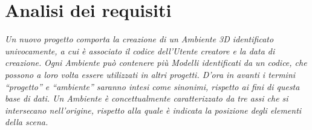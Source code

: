 \documentclass[a4paper,12pt]{report}
\begin{document}
\section{Analisi dei requisiti}
{\it Un nuovo progetto comporta la creazione di un Ambiente 3D identificato univocamente, a cui è associato il codice dell'Utente creatore e la data di creazione.}
{\it Ogni Ambiente può contenere più Modelli identificati da un codice, che possono a loro volta essere utilizzati in altri progetti. D'ora in avanti i termini ``progetto'' e ``ambiente'' saranno intesi come sinonimi, rispetto ai fini di questa base di dati. Un Ambiente è concettualmente caratterizzato da tre assi che si intersecano nell'origine, rispetto alla quale è indicata la posizione degli elementi della scena.}
\end{document}
